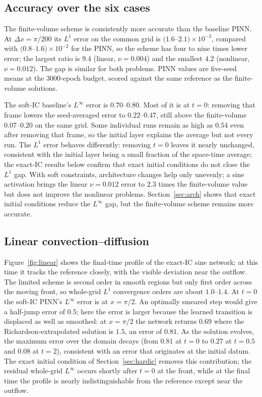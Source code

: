 \documentclass[11pt]{article}
\begin{document}
\subsection{Accuracy over the six cases}
\label{sec:accuracy}
The finite-volume scheme is consistently more accurate than the baseline
PINN. At $\Delta x=\pi/200$ its $L^1$ error on the common grid is
$(1.6$--$2.1)\times10^{-3}$, compared with $(0.8$--$1.6)\times10^{-2}$ for the
PINN, so the scheme has four to nine times lower error; the largest ratio is
$9.4$ (linear, $\nu=0.004$) and the smallest $4.2$ (nonlinear, $\nu=0.012$).
The gap is similar for both problems. PINN values are five-seed means at the
3000-epoch budget, scored against the same reference as the finite-volume
solutions.

The soft-IC baseline's $L^\infty$ error is $0.70$--$0.80$. Most of it is at
$t=0$: removing that frame lowers the seed-averaged error to $0.22$--$0.47$,
still above the finite-volume $0.07$--$0.20$ on the same grid. Some individual
runs remain as high as $0.54$ even after removing that frame, so the initial
layer explains the average but not every run. The $L^1$ error behaves
differently: removing $t=0$ leaves it nearly unchanged, consistent with the
initial layer being a small fraction of the space-time average; the exact-IC
results below confirm that exact initial conditions do not close the $L^1$
gap. With soft constraints, architecture changes help only unevenly; a
sine activation brings the linear $\nu=0.012$ error to $2.3$ times the
finite-volume value but does not improve the nonlinear problems.
Section~\ref{sec:arch} shows that exact initial conditions reduce the
$L^\infty$ gap, but the finite-volume scheme remains more accurate.

\subsection{Linear convection--diffusion}
Figure~\ref{fig:linear} shows the final-time profile of the exact-IC sine
network; at this time it tracks the reference closely, with the visible
deviation near the outflow. The limited scheme is second order in smooth
regions but only first order across the moving front, so whole-grid $L^1$
convergence orders are about $1.0$--$1.4$. At $t=0$ the soft-IC PINN's
$L^\infty$ error is at $x=\pi/2$. An optimally smeared step would give a
half-jump error of $0.5$; here the error is larger because the learned
transition is displaced as well as smoothed: at $x=\pi/2$ the network returns
$0.69$ where the Richardson-extrapolated solution is $1.5$, an error of
$0.81$. As the solution evolves, the maximum error over the domain decays
(from $0.81$ at $t=0$ to $0.27$ at $t=0.5$ and $0.08$ at $t=2$), consistent
with an error that originates at the initial datum. The exact initial
condition of Section~\ref{sec:hardic} removes this contribution; the residual
whole-grid $L^\infty$ occurs shortly after $t=0$ at the front, while at the
final time the profile is nearly indistinguishable from the reference except
near the outflow.
\end{document}
